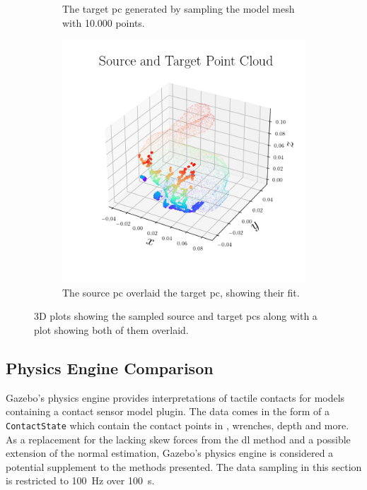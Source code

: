 \begin{figure}[!h]
\begin{subfigure}[b]{0.3\textwidth}
		\caption{The target \gls{pc} generated by sampling the model mesh with \num{10,000} points.}
		\label{fig:pc-target}
	\end{subfigure}
	\begin{subfigure}[b]{0.3\textwidth}
		\centering
		\includegraphics[width=\textwidth]{chapters/1-tactile-perception/fig/matplotlib/pc_source_target.png}
		\caption{The source \gls{pc} overlaid the target \gls{pc}, showing their fit.}
		\label{fig:pc-source-and-target}
	\end{subfigure}
	\caption{3D plots showing the sampled source and target \gls{pc}s along with a plot showing both of them overlaid.}
	\label{fig:contact-position-gazebo}
\end{figure}

\subsection{Physics Engine Comparison}\label{sec:1-tactile-perception-results-gazebo-comparison}

Gazebo's physics engine provides interpretations of tactile contacts for models containing a contact sensor model plugin. The data comes in the form of a \texttt{ContactState} which contain the contact points in , wrenches, depth and more. As a replacement for the lacking skew forces from the \gls{dl} method and a possible extension of the normal estimation, Gazebo's physics engine is considered a potential supplement to the methods presented. The data sampling in this section is restricted to \SI{100}{\hertz} over \SI{100}{\second}. \medskip

